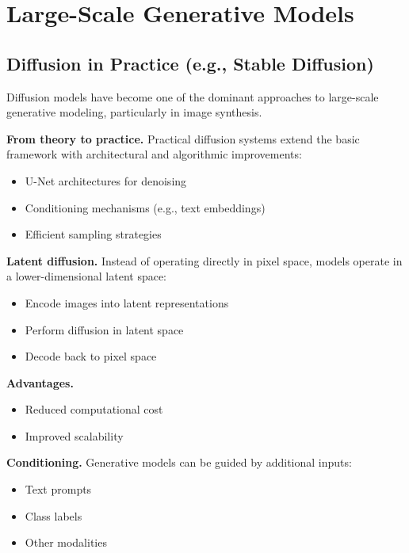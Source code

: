 \chapter{Large-Scale Generative Models}

\section{Diffusion in Practice (e.g., Stable Diffusion)}

Diffusion models have become one of the dominant approaches to large-scale generative modeling, particularly in image synthesis.

\medskip

\noindent
\textbf{From theory to practice.}  
Practical diffusion systems extend the basic framework with architectural and algorithmic improvements:
\begin{itemize}
    \item U-Net architectures for denoising
    \item Conditioning mechanisms (e.g., text embeddings)
    \item Efficient sampling strategies
\end{itemize}

\medskip

\noindent
\textbf{Latent diffusion.}  
Instead of operating directly in pixel space, models operate in a lower-dimensional latent space:
\begin{itemize}
    \item Encode images into latent representations
    \item Perform diffusion in latent space
    \item Decode back to pixel space
\end{itemize}

\medskip

\noindent
\textbf{Advantages.}
\begin{itemize}
    \item Reduced computational cost
    \item Improved scalability
\end{itemize}

\medskip

\noindent
\textbf{Conditioning.}  
Generative models can be guided by additional inputs:
\begin{itemize}
    \item Text prompts
    \item Class labels
    \item Other modalities
\end{itemize}

